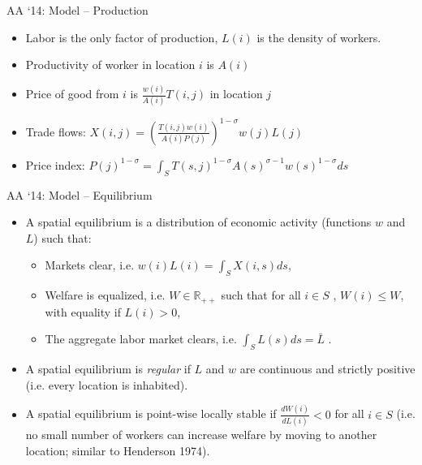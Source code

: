 \documentclass[11pt,notes=hide,aspectratio=169]{beamer}
\begin{document}
\begin{frame}{AA `14: Model -- Production}
\begin{itemize}
\item Labor is the only factor of production, $L(i)$  is the density of workers.
\item Productivity of worker in location $i$ is $A(i)$
\item Price of good from $i$ is $\frac{w\left(i\right)}{A\left(i\right)}T\left(i,j\right)$  in location $j$
\item Trade flows: $X(i,j) = \left (\frac{T(i,j)w(i)}{A(i)P(j)}\right)^{1-\sigma} w(j)L(j)$
\item Price index: $P(j)^{1-\sigma} = \int_{S}  T(s,j)^{1-\sigma} A(s)^{\sigma-1} w(s)^{1-\sigma} ds$
\end{itemize}
\end{frame}
\begin{frame}{AA `14: Model -- Equilibrium}
\begin{itemize}
\item A spatial equilibrium is a distribution of economic activity (functions $w$ and $L$) such that:
\begin{itemize}
\item Markets clear, i.e. $w\left(i\right)L\left(i\right)=\int_{S}X\left(i,s\right)ds$, 
\item Welfare is equalized, i.e. $W\in\mathbb{R}_{++}$  such that for all $ i\in S$ , $W\left(i\right)\leq W$, with equality if $L\left(i\right)>0$, 
\item The aggregate labor market clears, i.e. $\int_{S}L\left(s\right)ds=\bar{L}$ . 
\end{itemize}
\medskip
\item A spatial equilibrium is \textit{regular} if $L$ and $w$ are continuous and strictly positive (i.e. every location is inhabited).\medskip
\item A spatial equilibrium is point-wise locally stable if $\frac{dW\left(i\right)}{dL\left(i\right)}<0$ for all $  i\in S$ (i.e. no small number of workers can increase welfare by moving to another location; similar to Henderson 1974).
\end{itemize}
\end{frame}
\end{document}
